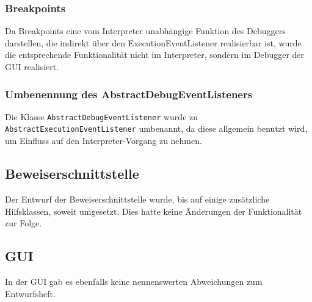 \subsubsection{Breakpoints\label{aenderung_interpreter_breakpoints}}
Da Breakpoints eine vom Interpreter unabhängige Funktion des Debuggers darstellen, die indirekt über den ExecutionEventListener realisierbar ist, wurde die entsprechende Funktionalität nicht im Interpreter, sondern im Debugger der GUI realisiert.

\subsubsection{Umbenennung des AbstractDebugEventListeners}
Die Klasse \texttt{AbstractDebugEventListener} wurde zu \texttt{AbstractExecutionEventListener} umbenannt, da diese allgemein benutzt wird, um Einfluss auf den Interpreter-Vorgang zu nehmen.

\subsection{Beweiserschnittstelle}
Der Entwurf der Beweiserschnittstelle wurde, bis auf einige zusätzliche Hilfsklassen, soweit umgesetzt. Dies hatte keine Änderungen der Funktionalität zur Folge.

\subsection{GUI}
In der GUI gab es ebenfalls keine nennenswerten Abweichungen zum Entwurfsheft.
